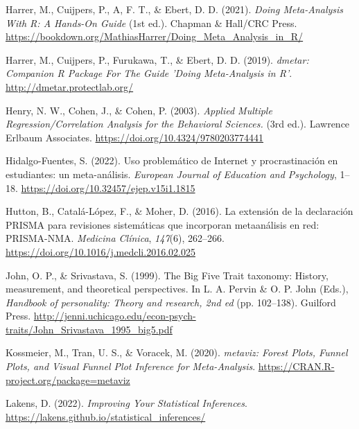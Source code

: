 \documentclass[
  bookmarksnumbered]{article}
\newlength{\cslhangindent}
\newlength{\cslentryspacingunit} %
\newenvironment{CSLReferences}[2] %
 {%
  \setlength{\parindent}{0pt}
  \ifodd #1
  \let\oldpar\par
  \def\par{\hangindent=\cslhangindent\oldpar}
  \fi
  \setlength{\parskip}{#2\cslentryspacingunit}
 }%
 {}
\begin{document}
\begin{CSLReferences}{1}{0}
\leavevmode{}%
Harrer, M., Cuijpers, P., A, F. T., \& Ebert, D. D. (2021). \emph{{Doing Meta-Analysis With {R}: A Hands-On Guide}} (1st ed.). Chapman \& Hall/CRC Press. \url{https://bookdown.org/MathiasHarrer/Doing_Meta_Analysis_in_R/}

\leavevmode{}%
Harrer, M., Cuijpers, P., Furukawa, T., \& Ebert, D. D. (2019). \emph{{dmetar: Companion R Package For The Guide 'Doing Meta-Analysis in R'}}. \url{http://dmetar.protectlab.org/}

\leavevmode{}%
Henry, N. W., Cohen, J., \& Cohen, P. (2003). \emph{Applied {Multiple Regression}/{Correlation Analysis} for the {Behavioral Sciences}.} (3rd ed.). {Lawrence Erlbaum Associates}. \url{https://doi.org/10.4324/9780203774441}

\leavevmode{}%
Hidalgo-Fuentes, S. (2022). {Uso problemático de Internet y procrastinación en estudiantes: un meta-análisis}. \emph{European Journal of Education and Psychology}, 1--18. \url{https://doi.org/10.32457/ejep.v15i1.1815}

\leavevmode{}%
Hutton, B., Catalá-López, F., \& Moher, D. (2016). {La extensión de la declaración PRISMA para revisiones sistemáticas que incorporan metaanálisis en red: PRISMA-NMA}. \emph{Medicina Clínica}, \emph{147}(6), 262--266. \url{https://doi.org/10.1016/j.medcli.2016.02.025}

\leavevmode{}%
John, O. P., \& Srivastava, S. (1999). The {Big Five Trait} taxonomy: {History}, measurement, and theoretical perspectives. In L. A. Pervin \& O. P. John (Eds.), \emph{Handbook of personality: {Theory} and research, 2nd ed} (pp. 102--138). {Guilford Press}. \url{http://jenni.uchicago.edu/econ-psych-traits/John_Srivastava_1995_big5.pdf}

\leavevmode{}%
Kossmeier, M., Tran, U. S., \& Voracek, M. (2020). \emph{{metaviz: Forest Plots, Funnel Plots, and Visual Funnel Plot Inference for Meta-Analysis}}. \url{https://CRAN.R-project.org/package=metaviz}

\leavevmode{}%
Lakens, D. (2022). \emph{Improving {Your Statistical Inferences}}. \url{https://lakens.github.io/statistical_inferences/}


\end{CSLReferences}
\end{document}
